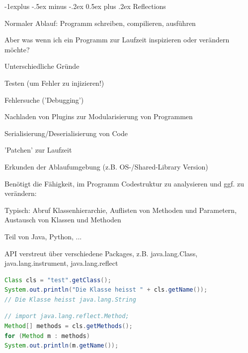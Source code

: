 \documentclass[10pt]{article}
\makeatletter
\renewcommand{\subsection}{\@startsection{subsection}{2}{0mm}%
                                {-1explus -.5ex minus -.2ex}%
                                {0.5ex plus .2ex}%
                                {\normalfont\normalsize\bfseries}}
\makeatother
\begin{document}
\subsection{Reflections}
\begin{itemize*}
  \item Normaler Ablauf: Programm schreiben, compilieren, ausführen
  \begin{itemize*}
    \item Aber was wenn ich ein Programm zur Laufzeit inspizieren oder verändern möchte?
  \end{itemize*}
  \item Unterschiedliche Gründe
  \begin{itemize*}
    \item Testen (um Fehler zu injizieren!)
    \item Fehlersuche ('Debugging')
    \item Nachladen von Plugins zur Modularisierung von Programmen
    \item Serialisierung/Deserialisierung von Code
    \item 'Patchen' zur Laufzeit
    \item Erkunden der Ablaufumgebung (z.B. OS-/Shared-Library Version)
  \end{itemize*}
  \item Benötigt die Fähigkeit, im Programm Codestruktur zu analysieren und ggf. zu verändern:
  \begin{itemize*}
    \item Typisch: Abruf Klassenhierarchie, Auflisten von Methoden und Parametern, Austausch von Klassen und Methoden
    \item Teil von Java, Python, ...
  \end{itemize*}
\end{itemize*}

API verstreut über verschiedene Packages, z.B. java.lang.Class, java.lang.instrument, java.lang.reflect

\begin{lstlisting}[language=java]
Class cls = "test".getClass();
System.out.println("Die Klasse heisst " + cls.getName());
// Die Klasse heisst java.lang.String
\end{lstlisting}

\begin{lstlisting}[language=java]
// import java.lang.reflect.Method;
Method[] methods = cls.getMethods();
for (Method m : methods)
System.out.println(m.getName());
\end{lstlisting}
\end{document}

